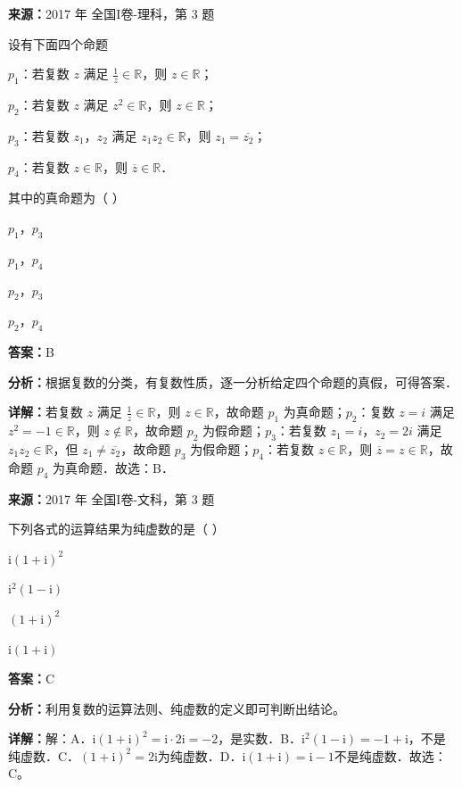 \begin{question}[points=5]
\textbf{来源：}2017 年 全国I卷-理科，第 3 题\par
设有下面四个命题



$p_1$：若复数 $z$ 满足 $\frac{1}{z}\in\mathbb{R}$，则 $z\in\mathbb{R}$；



$p_2$：若复数 $z$ 满足 $z^2\in\mathbb{R}$，则 $z\in\mathbb{R}$；



$p_3$：若复数 $z_1$，$z_2$ 满足 $z_1z_2\in\mathbb{R}$，则 $z_1=\overline{z_2}$；



$p_4$：若复数 $z\in\mathbb{R}$，则 $\overline{z}\in\mathbb{R}$．

其中的真命题为（ ）
\begin{choices}
  \item $p_1$，$p_3$
  \item $p_1$，$p_4$
  \item $p_2$，$p_3$
  \item $p_2$，$p_4$
\end{choices}
\begin{solution}
\textbf{答案：}B

\textbf{分析：}根据复数的分类，有复数性质，逐一分析给定四个命题的真假，可得答案．

\textbf{详解：}若复数 $z$ 满足 $\frac{1}{z}\in\mathbb{R}$，则 $z\in\mathbb{R}$，故命题 $p_1$ 为真命题；$p_2$：复数 $z=i$ 满足 $z^2=-1\in\mathbb{R}$，则 $z\notin\mathbb{R}$，故命题 $p_2$ 为假命题；$p_3$：若复数 $z_1=i$，$z_2=2i$ 满足 $z_1z_2\in\mathbb{R}$，但 $z_1\neq \overline{z_2}$，故命题 $p_3$ 为假命题；$p_4$：若复数 $z\in\mathbb{R}$，则 $\overline{z}=z\in\mathbb{R}$，故命题 $p_4$ 为真命题．故选：B．
\end{solution}
\end{question}

\begin{question}[points=5]
\textbf{来源：}2017 年 全国I卷-文科，第 3 题\par
下列各式的运算结果为纯虚数的是（                ）
\begin{choices}
  \item $\text{i}(1+\text{i})^2$
  \item $\text{i}^2(1-\text{i})$
  \item $(1+\text{i})^2$
  \item $\text{i}(1+\text{i})$
\end{choices}
\begin{solution}
\textbf{答案：}C

\textbf{分析：}利用复数的运算法则、纯虚数的定义即可判断出结论。

\textbf{详解：}解：A．$\text{i}(1+\text{i})^2=\text{i}\cdot2\text{i}=-2$，是实数．B．$\text{i}^2(1-\text{i})=-1+\text{i}$，不是纯虚数．C．$(1+\text{i})^2=2\text{i}$为纯虚数．D．$\text{i}(1+\text{i})=\text{i}-1$不是纯虚数．故选：C。
\end{solution}
\end{question}

